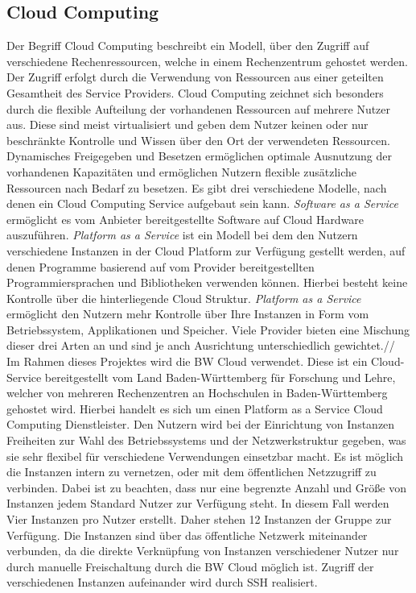 \subsection{Cloud Computing}
Der Begriff Cloud Computing beschreibt ein Modell, über den Zugriff auf verschiedene Rechenressourcen, welche in einem Rechenzentrum gehostet werden. Der Zugriff erfolgt durch die Verwendung von Ressourcen aus einer geteilten Gesamtheit des Service Providers. Cloud Computing zeichnet sich besonders durch die flexible Aufteilung der vorhandenen Ressourcen auf mehrere Nutzer aus. Diese sind meist virtualisiert und geben dem Nutzer keinen oder nur beschränkte Kontrolle und Wissen über den Ort der verwendeten Ressourcen. Dynamisches Freigegeben und Besetzen ermöglichen optimale Ausnutzung der vorhandenen Kapazitäten und ermöglichen Nutzern flexible zusätzliche Ressourcen nach Bedarf zu besetzen. Es gibt drei verschiedene Modelle, nach denen ein Cloud Computing Service aufgebaut sein kann. \textit{Software as a Service} ermöglicht es vom Anbieter bereitgestellte Software auf Cloud Hardware auszuführen. \textit{Platform as a Service} ist ein Modell bei dem den Nutzern verschiedene Instanzen in der Cloud Platform zur Verfügung gestellt werden, auf denen Programme basierend auf vom Provider bereitgestellten Programmiersprachen und Bibliotheken verwenden können. Hierbei besteht keine Kontrolle über die hinterliegende Cloud Struktur. \textit{Platform as a Service} ermöglicht den Nutzern mehr Kontrolle über Ihre Instanzen in Form vom Betriebssystem, Applikationen und Speicher.\cite{b2} Viele Provider bieten eine Mischung dieser drei Arten an und sind je anch Ausrichtung unterschiedlich gewichtet.//
Im Rahmen dieses Projektes wird die BW Cloud verwendet. Diese ist ein Cloud-Service bereitgestellt vom Land Baden-Württemberg für Forschung und Lehre, welcher von mehreren Rechenzentren an Hochschulen in Baden-Württemberg gehostet wird. Hierbei handelt es sich um einen Platform as a Service Cloud Computing Dienstleister. Den Nutzern wird bei der Einrichtung von Instanzen Freiheiten zur Wahl des Betriebssystems und der Netzwerkstruktur gegeben, was sie sehr flexibel für verschiedene Verwendungen einsetzbar macht. Es ist möglich die Instanzen intern zu vernetzen, oder mit dem öffentlichen Netzzugriff zu verbinden. Dabei ist zu beachten, dass nur eine begrenzte Anzahl und Größe von Instanzen jedem Standard Nutzer zur Verfügung steht. In diesem Fall werden Vier Instanzen pro Nutzer erstellt. Daher stehen 12 Instanzen der Gruppe zur Verfügung. Die Instanzen sind über das öffentliche Netzwerk miteinander verbunden, da die direkte Verknüpfung von Instanzen verschiedener Nutzer nur durch manuelle Freischaltung durch die BW Cloud möglich ist. Zugriff der verschiedenen Instanzen aufeinander wird durch SSH realisiert.
\\
  

